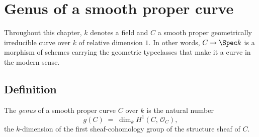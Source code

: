 \chapter{Genus of a smooth proper curve}
\label{chap:Genus}

Throughout this chapter, \(k\) denotes a field and \(C\) a smooth proper geometrically irreducible curve over \(k\) of relative dimension \(1\). In other words, \(C \to \Spec k\) is a morphism of schemes carrying the geometric typeclasses that make it a curve in the modern sense.

\section{Definition}

\begin{definition}
  \label{def:genus}
  
  The \emph{genus} of a smooth proper curve \(C\) over \(k\) is the natural number
  \[
    g(C) \;=\; \dim_k H^1(C,\, \mathcal O_C),
  \]
  the \(k\)-dimension of the first sheaf-cohomology group of the structure sheaf of \(C\).
\end{definition}

